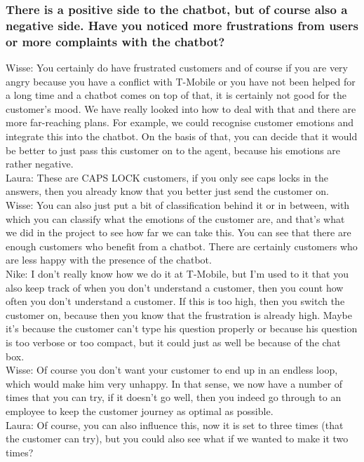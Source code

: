 \begin{appendices}
	\subsubsection{There is a positive side to the chatbot, but of course also a negative side.
		Have you noticed more frustrations from users or more complaints with the
		chatbot?}
	Wisse: You certainly do have frustrated customers and of course if you are very angry because you have a conflict with T-Mobile or you have not been helped for a long time and a chatbot comes on top of that, it is certainly not good for the customer's mood. We have really looked into how to deal with that and there are more far-reaching plans. For example, we could recognise customer emotions and integrate this into the chatbot. On the basis of that, you can decide that it would be better to just pass this customer on to the agent, because his emotions are rather negative.\\
	\break
	Laura: These are CAPS LOCK customers, if you only see caps locks in the answers, then you already know that you better just send the customer on.\\
	\break
	Wisse: You can also just put a bit of classification behind it or in between, with which you can classify what the emotions of the customer are, and that's what we did in the project to see how far we can take this. You can see that there are enough customers who benefit from a chatbot. There are certainly customers who are less happy with the presence of the chatbot.\\
	\break
	Nike: I don't really know how we do it at T-Mobile, but I'm used to it that you also keep track of when you don't understand a customer, then you count how often you don't understand a customer. If this is too high, then you switch the customer on, because then you know that the frustration is already high. Maybe it's because the customer can't type his question properly or because his question is too verbose or too compact, but it could just as well be because of the chat box.\\
	\break
	Wisse: Of course you don't want your customer to end up in an endless loop, which would make him very unhappy. In that sense, we now have a number of times that you can try, if it doesn't go well, then you indeed go through to an employee to keep the customer journey as optimal as possible.\\
	\break
	Laura: Of course, you can also influence this, now it is set to three times (that the customer can try), but you could also see what if we wanted to make it two times?
	

\end{appendices}
